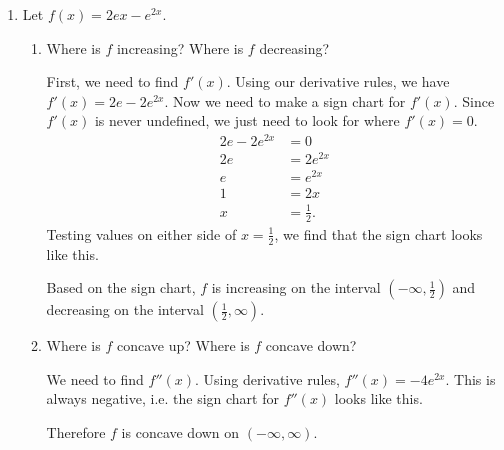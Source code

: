 \documentclass{article}
\begin{document}
\begin{enumerate}[resume]
\begin{enumerate}
  \end{enumerate}

\item  

  Let $f(x) = 2ex - e^{2x}$.

  \begin{enumerate}
  \item
    \begin{problem}[\nstretch{3}]
      Where is $f$ increasing? Where is $f$ decreasing? 
    \end{problem}

    \begin{solution}
      First, we need to find $f'(x)$. Using our derivative rules, we have $f'(x)=2e-2e^{2x}$.
      Now we need to make a sign chart for $f'(x)$. Since $f'(x)$ is never undefined,
      we just need to look for where $f'(x)=0$.
      \begin{align*}
          2e - 2e^{2x} &= 0 \\
          2e &= 2e^{2x} \\
          e &= e^{2x} \\
          1 &= 2x \\
          x &= \tfrac{1}{2}. 
      \end{align*}
      Testing values on either side of $x=\frac{1}{2}$, we find that the sign chart looks
      like this.
       \begin{center}
      \end{center}
      Based on the sign chart, $f$ is increasing on the interval $(-\infty, \frac{1}{2})$
      and decreasing on the interval $(\frac{1}{2}, \infty)$. 
    \end{solution}

  \item
    \begin{problem}[\vfill]
      Where is $f$ concave up? Where is $f$ concave down? 
    \end{problem}

    \begin{solution}
      We need to find $f''(x)$. Using derivative rules, $f''(x)=-4e^{2x}$. This is always
      negative, i.e. the sign chart for $f''(x)$ looks like this.
      \begin{center}
      \end{center}
      Therefore $f$ is concave down on $(-\infty, \infty)$. 
    \end{solution}


\end{enumerate}
\end{enumerate}
\end{document}

